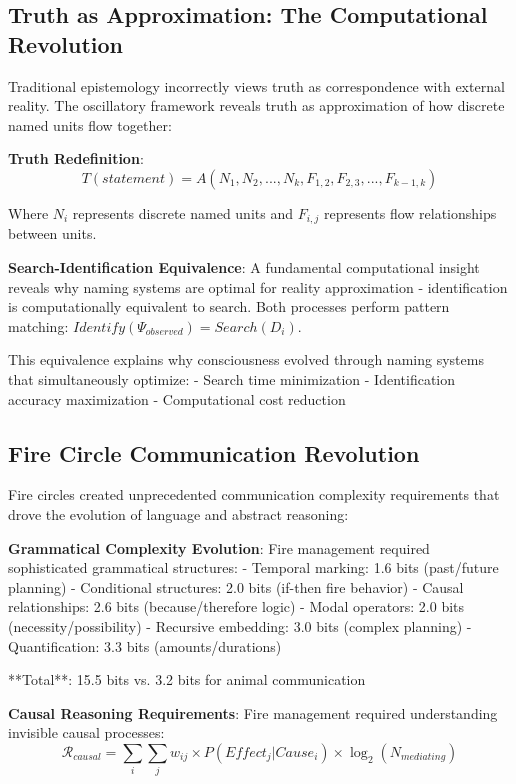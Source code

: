 \documentclass[12pt]{article}
\begin{document}
\subsection{Truth as Approximation: The Computational Revolution}

Traditional epistemology incorrectly views truth as correspondence with external reality. The oscillatory framework reveals truth as approximation of how discrete named units flow together:

\textbf{Truth Redefinition}:
$$T(statement) = A(N_1, N_2, ..., N_k, F_{1,2}, F_{2,3}, ..., F_{k-1,k})$$

Where $N_i$ represents discrete named units and $F_{i,j}$ represents flow relationships between units.

\textbf{Search-Identification Equivalence}: A fundamental computational insight reveals why naming systems are optimal for reality approximation - identification is computationally equivalent to search. Both processes perform pattern matching: $Identify(\Psi_{observed}) = Search(D_i)$.

This equivalence explains why consciousness evolved through naming systems that simultaneously optimize:
- Search time minimization
- Identification accuracy maximization  
- Computational cost reduction

\subsection{Fire Circle Communication Revolution}

Fire circles created unprecedented communication complexity requirements that drove the evolution of language and abstract reasoning:

\textbf{Grammatical Complexity Evolution}: Fire management required sophisticated grammatical structures:
- Temporal marking: 1.6 bits (past/future planning)
- Conditional structures: 2.0 bits (if-then fire behavior)
- Causal relationships: 2.6 bits (because/therefore logic)
- Modal operators: 2.0 bits (necessity/possibility)
- Recursive embedding: 3.0 bits (complex planning)
- Quantification: 3.3 bits (amounts/durations)

**Total**: 15.5 bits vs. 3.2 bits for animal communication

\textbf{Causal Reasoning Requirements}: Fire management required understanding invisible causal processes:
$$\mathcal{R}_{causal} = \sum_{i} \sum_{j} w_{ij} \times P(Effect_j | Cause_i) \times \log_2(N_{mediating})$$
\end{document}
